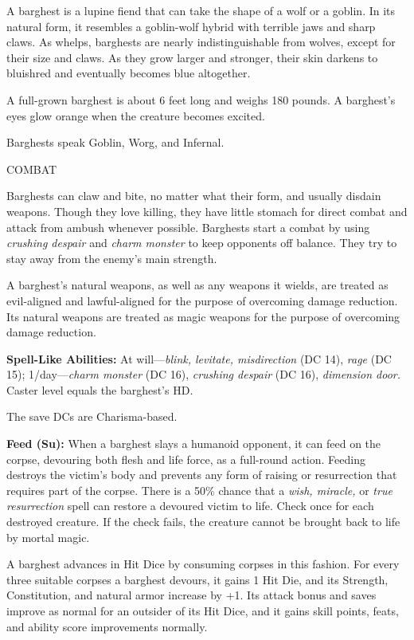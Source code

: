 \documentclass{article}
\begin{document}
A barghest is a lupine fiend that can take the shape of a wolf or a goblin. In 
its natural form, it resembles a goblin-wolf hybrid with terrible jaws and sharp 
claws. As whelps, barghests are nearly indistinguishable from wolves, except for 
their size and claws. As they grow larger and stronger, their skin darkens to bluishred 
and eventually becomes blue altogether.

A full-grown barghest is about 6 feet long and weighs 180 pounds. A barghest's 
eyes glow orange when the creature becomes excited.

Barghests speak Goblin, Worg, and Infernal.

COMBAT

Barghests can claw and bite, no matter what their form, and usually disdain weapons. 
Though they love killing, they have little stomach for direct combat and attack 
from ambush whenever possible. Barghests start a combat by using \textit{crushing 
despair }and \textit{charm monster }to keep opponents off balance. They try to 
stay away from the enemy's main strength.

A barghest's natural weapons, as well as any weapons it wields, are treated as 
evil-aligned and lawful-aligned for the purpose of overcoming damage reduction. 
Its natural weapons are treated as magic weapons for the purpose of overcoming 
damage reduction.

\textbf{Spell-Like Abilities:} At will---\textit{blink, levitate, misdirection 
}(DC 14), \textit{rage }(DC 15); 1/day---\textit{charm monster }(DC 16), \textit{crushing 
despair }(DC 16), \textit{dimension door. }Caster level equals the barghest's HD.

The save DCs are Charisma-based.

\textbf{Feed (Su):} When a barghest slays a humanoid opponent, it can feed on the 
corpse, devouring both flesh and life force, as a full-round action. Feeding destroys 
the victim's body and prevents any form of raising or resurrection that requires 
part of the corpse. There is a 50\% chance that a \textit{wish, miracle, }or \textit{true 
resurrection }spell can restore a devoured victim to life. Check once for each 
destroyed creature. If the check fails, the creature cannot be brought back to 
life by mortal magic.

A barghest advances in Hit Dice by consuming corpses in this fashion. For every 
three suitable corpses a barghest devours, it gains 1 Hit Die, and its Strength, 
Constitution, and natural armor increase by +1. Its attack bonus and saves improve 
as normal for an outsider of its Hit Dice, and it gains skill points, feats, and 
ability score improvements normally.
\end{document}
